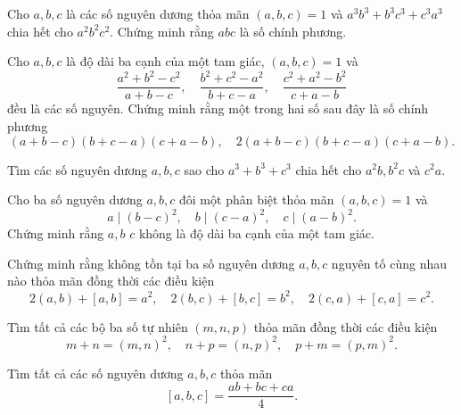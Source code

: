 \begin{btt}
Cho $a,b,c$ là các số nguyên dương thỏa mãn $(a,b,c)=1$ và $a^3b^3+b^3c^3+c^3a^3$ chia hết cho $a^2b^2c^2$. Chứng minh rằng $abc$ là số chính phương.
\end{btt}

\begin{btt}
Cho $a, b, c$ là độ dài ba cạnh của một tam giác, $(a, b, c)=1$ và
$$\dfrac{a^{2}+b^{2}-c^{2}}{a+b-c}, \quad \dfrac{b^{2}+c^{2}-a^{2}}{b+c-a}, \quad \dfrac{c^{2}+a^{2}-b^{2}}{c+a-b}$$
đều là các số nguyên. Chứng minh rằng một trong hai số sau đây là số chính phương
$$(a+b-c)(b+c-a)(c+a-b),\quad 2(a+b-c)(b+c-a)(c+a-b).$$ 
\end{btt}

\begin{btt}
Tìm các số nguyên dương $a,b,c$ sao cho $a^3+b^3+c^3$ chia hết cho $a^2b,b^2c$ và $c^2a.$
\end{btt}

\begin{btt}
Cho ba số nguyên dương $a,b,c$ đôi một phân biệt thỏa mãn $(a,b,c) = 1$ và 
$$a \mid (b - c)^2, \quad b \mid (c-  a)^2, \quad c \mid (a - b)^2.$$ Chứng minh rằng $a, b$  $c$ không là độ dài ba cạnh của một tam giác.
\end{btt}

\begin{btt}
Chứng minh rằng không tồn tại ba số nguyên dương $a,b,c$ nguyên tố cùng nhau nào thỏa mãn đồng thời các điều kiện 
\[2(a,b)+[a,b]=a^2,\quad 2(b,c)+[b,c]=b^2,\quad 2(c,a)+[c,a]=c^2.\]
\end{btt}

\begin{btt}
Tìm tất cả các bộ ba số tự nhiên $(m,n,p)$ thỏa mãn đồng thời các điều kiện
\[m + n = {\left( {m,n} \right)^2},\quad n + p= {\left( {n,p} \right)^2},\quad p+m = {\left( {p,m} \right)^2}.\]
\end{btt}

\begin{btt}
Tìm tất cả các số nguyên dương $a,b,c$ thỏa mãn \[[a,b,c]=\dfrac{ab+bc+ca}{4}.\]
\end{btt}

